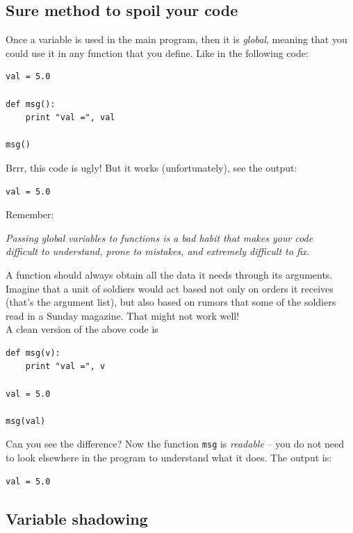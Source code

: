 \subsection{Sure method to spoil your code}

Once a variable is used in the main program, 
then it is {\em global}, meaning that you could use it in 
any function that you define. Like in the following 
code:

\begin{verbatim}
val = 5.0

def msg():
    print "val =", val

msg()
\end{verbatim}
Brrr, this code is ugly! But it works (unfortunately), see the output:

\begin{verbatim}
val = 5.0
\end{verbatim}
Remember:\\

\begin{center}
{\em Passing global variables to functions is a bad habit that makes your code\\
     difficult to understand, prone to mistakes, and extremely difficult to fix}.\\
\end{center}
\vspace{4mm}
\noindent
A function should always
obtain all the data it needs through its arguments. Imagine that a unit of soldiers 
would act based not only on orders it receives (that's the argument 
list), but also based on rumors that some of the soldiers read in a Sunday magazine. 
That might not work well!\\

\noindent
A clean version of the above code is

\begin{verbatim}
def msg(v):
    print "val =", v

val = 5.0

msg(val)
\end{verbatim}
Can you see the difference? Now the function {\tt msg} is {\em readable} -- you do not 
need to look elsewhere in the program to understand what it does. The output is:

\begin{verbatim}
val = 5.0
\end{verbatim}

\subsection{Variable shadowing}

